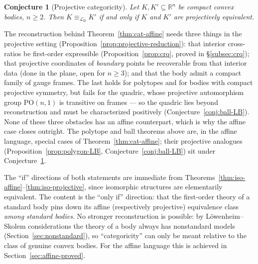 \documentclass[11pt]{amsart}
\newtheorem{conjecture}[theorem]{Conjecture}
\theoremstyle{definition}
\newcommand{\R}{\mathbb{R}}
\newcommand{\LB}{\mathcal{L}_{\mathrm{B}}}
\begin{document}
\begin{conjecture}[Projective categoricity]\label{conj:cat-projective}
Let $K,K'\subseteq\R^n$ be compact convex bodies, $n\ge2$. Then
$K\equiv_{\LB}K'$ if and only if $K$ and $K'$ are projectively equivalent.
\end{conjecture}

The reconstruction behind Theorem~\ref{thm:cat-affine} needs three things in
the projective setting (Proposition~\ref{prop:projective-reduction}): that
interior cross-ratios be first-order expressible
(Proposition~\ref{prop:crq}, proved in \S\ref{subsec:crq}); that projective coordinates of \emph{boundary}
points be recoverable from that interior data (done in the plane, open for
$n\ge3$); and that the body admit a compact family of gauge frames. The last
holds for polytopes and for bodies with compact projective symmetry, but fails
for the quadric, whose projective automorphism group $\mathrm{PO}(n,1)$ is
transitive on frames --- so the quadric lies beyond reconstruction and must be
characterized positively (Conjecture~\ref{conj:ball-LB}). None of these three
obstacles has an affine counterpart, which is why the affine case closes
outright. The polytope and ball theorems above are, in the affine language,
special cases of Theorem~\ref{thm:cat-affine}; their projective analogues
(Proposition~\ref{prop:polygon-LB}, Conjecture~\ref{conj:ball-LB}) sit under
Conjecture~\ref{conj:cat-projective}.

The ``if'' directions of both statements are immediate from
Theorems~\ref{thm:iso-affine}--\ref{thm:iso-projective}, since isomorphic
structures are elementarily equivalent. The content is the ``only if''
direction: that the first-order theory of a standard body pins down its
affine (respectively projective) equivalence class \emph{among standard
bodies}. No stronger reconstruction is possible: by L\"owenheim--Skolem
considerations the theory of a body always has nonstandard models
(Section~\ref{sec:nonstandard}), so ``categoricity'' can only be meant
relative to the class of genuine convex bodies. For the affine language this is
achieved in Section~\ref{sec:affine-proved}.
\end{document}
